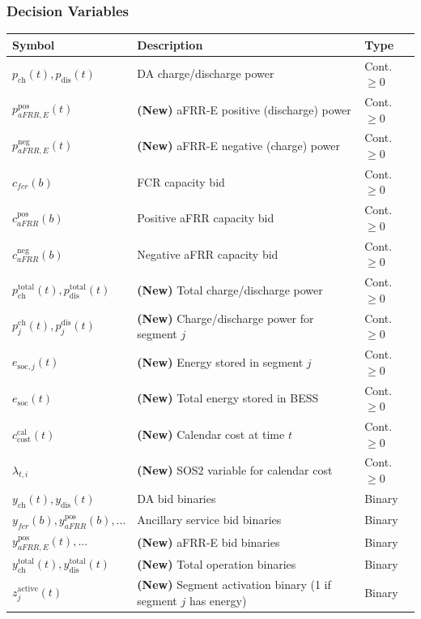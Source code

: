\documentclass[11pt, a4paper]{article}
\begin{document}
\subsubsection*{Decision Variables}
\begin{tabular}{@{}lll}
\toprule
Symbol & Description & Type \\
\midrule
$p_{\mathrm{ch}}(t), p_{\mathrm{dis}}(t)$ & DA charge/discharge power & Cont. $\ge 0$ \\
$p^{\mathrm{pos}}_{aFRR,E}(t)$ & \textbf{(New)} aFRR-E positive (discharge) power & Cont. $\ge 0$ \\
$p^{\mathrm{neg}}_{aFRR,E}(t)$ & \textbf{(New)} aFRR-E negative (charge) power & Cont. $\ge 0$ \\
$c_{fcr}(b)$ & FCR capacity bid & Cont. $\ge 0$ \\
$c^{\mathrm{pos}}_{aFRR}(b)$ & Positive aFRR capacity bid & Cont. $\ge 0$ \\
$c^{\mathrm{neg}}_{aFRR}(b)$ & Negative aFRR capacity bid & Cont. $\ge 0$ \\
$p^{\mathrm{total}}_{\mathrm{ch}}(t), p^{\mathrm{total}}_{\mathrm{dis}}(t)$ & \textbf{(New)} Total charge/discharge power & Cont. $\ge 0$ \\
$p^{\mathrm{ch}}_{j}(t), p^{\mathrm{dis}}_{j}(t)$ & \textbf{(New)} Charge/discharge power for segment $j$ & Cont. $\ge 0$ \\
$e_{\mathrm{soc},j}(t)$ & \textbf{(New)} Energy stored in segment $j$ & Cont. $\ge 0$ \\
$e_{\mathrm{soc}}(t)$ & \textbf{(New)} Total energy stored in BESS & Cont. $\ge 0$ \\
$c^{\mathrm{cal}}_{\mathrm{cost}}(t)$ & \textbf{(New)} Calendar cost at time $t$ & Cont. $\ge 0$ \\
$\lambda_{t,i}$ & \textbf{(New)} SOS2 variable for calendar cost & Cont. $\ge 0$ \\
$y_{\mathrm{ch}}(t), y_{\mathrm{dis}}(t)$ & DA bid binaries & Binary \\
$y_{fcr}(b), y^{\mathrm{pos}}_{aFRR}(b), ...$ & Ancillary service bid binaries & Binary \\
$y^{\mathrm{pos}}_{aFRR,E}(t), ...$ & \textbf{(New)} aFRR-E bid binaries & Binary \\
$y^{\mathrm{total}}_{\mathrm{ch}}(t), y^{\mathrm{total}}_{\mathrm{dis}}(t)$ & \textbf{(New)} Total operation binaries & Binary \\
$z^{\text{active}}_{j}(t)$ & \textbf{(New)} Segment activation binary (1 if segment $j$ has energy) & Binary \\
\bottomrule
\end{tabular}
\end{document}
